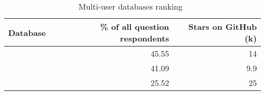 \begin{table}[ht]
\centering
\caption{Multi-user databases ranking~\parencite{stackOverflowPollDatabases23}}
\label{tab:stackOverflowDatabasesRanking}
\begin{tabular}[t]{|l|r|r|}
\toprule
Database & \% of all question respondents & Stars on GitHub (k)\\
\midrule
\cite{githubPostgreSql} & 45.55 & 14\\
\cite{githubMySql} & 41.09 & 9.9\\
\cite{githubMongoDb} & 25.52 & 25\\
\bottomrule
\end{tabular}
\end{table}